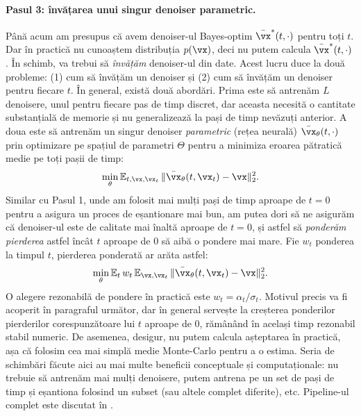 \documentclass[../../book-main_ro.tex]{subfiles}
\begin{document}
\paragraph{Pasul 3: învățarea unui singur denoiser parametric.} Până acum am presupus că avem denoiser-ul Bayes-optim \(\bar{\vx}^{\ast}(t, \cdot)\) pentru toți \(t\). Dar în practică nu cunoaștem distribuția \(p(\vx)\), deci nu putem calcula \(\bar{\vx}^{\ast}(t, \cdot)\). În schimb, va trebui să \textit{învățăm} denoiser-ul din date. Acest lucru duce la două probleme: (1) cum să învățăm un denoiser și (2) cum să învățăm un denoiser pentru fiecare \(t\). În general, există două abordări. Prima este să antrenăm \(L\) denoisere, unul pentru fiecare pas de timp discret, dar aceasta necesită o cantitate substanțială de memorie și nu generalizează la pași de timp nevăzuți anterior. A doua este să antrenăm un singur denoiser \textit{parametric} (rețea neurală) \(\bar{\vx}_{\theta}(t, \cdot)\) prin optimizare pe spațiul de parametri \(\Theta\) pentru a minimiza eroarea pătratică medie pe toți pașii de timp:
\begin{equation}
	\min_{\theta}\Ex_{t, \vx, \vx_{t}}\norm{\bar{\vx}_{\theta}(t, \vx_{t}) - \vx}_{2}^{2}.
\end{equation}
Similar cu Pasul 1, unde am folosit mai mulți pași de timp aproape de \(t = 0\) pentru a asigura un proces de eșantionare mai bun, am putea dori să ne asigurăm că denoiser-ul este de calitate mai înaltă aproape de \(t = 0\), și astfel să \textit{ponderăm pierderea} astfel încât \(t\) aproape de \(0\) să aibă o pondere mai mare. Fie \(w_{t}\) ponderea la timpul \(t\), pierderea ponderată ar arăta astfel:
\begin{equation}\label{eq:parametric_denoising_loss}
	\min_{\theta}\Ex_{t}w_{t}\Ex_{\vx, \vx_{t}}\norm{\bar{\vx}_{\theta}(t, \vx_{t}) - \vx}_{2}^{2}.
\end{equation}
O alegere rezonabilă de pondere în practică este \(w_{t} = \alpha_{t}/\sigma_{t}\). Motivul precis va fi acoperit în paragraful următor, dar în general servește la creșterea ponderilor pierderilor corespunzătoare lui \(t\) aproape de \(0\), rămânând în același timp rezonabil stabil numeric. De asemenea, desigur, nu putem calcula așteptarea în practică, așa că folosim cea mai simplă medie Monte-Carlo pentru a o estima. Seria de schimbări făcute aici au mai multe beneficii conceptuale și computaționale: nu trebuie să antrenăm mai mulți denoisere, putem antrena pe un set de pași de timp și eșantiona folosind un subset (sau altele complet diferite), etc. Pipeline-ul complet este discutat în .
\end{document}
